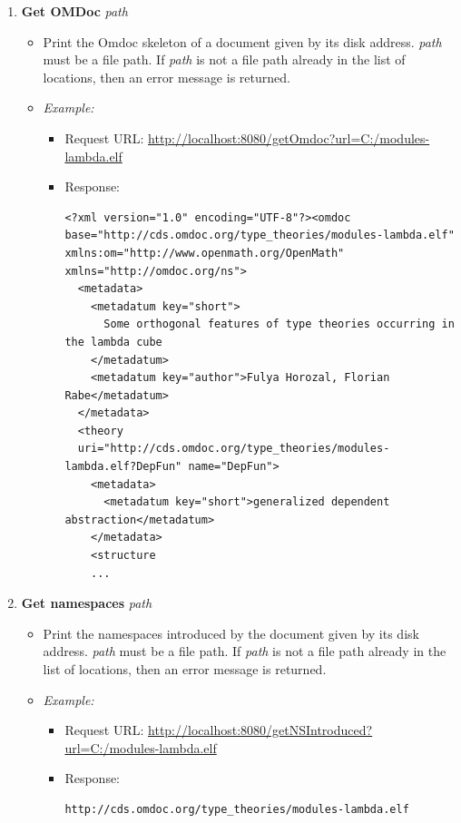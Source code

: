 \begin{enumerate}
\item \textbf{Get OMDoc} \qquad  {}\textit{path}
	\begin{itemize}
	\item Print the Omdoc skeleton of a document given by its disk address. \textit{path} must be a file path. If \textit{path} is  not a file path already in the list of locations, then an error message is returned.
	\item \textit{Example:} 
		\begin{itemize}
		\item Request URL:  \url{http://localhost:8080/getOmdoc?url=C:/modules-lambda.elf}
		\item Response: 
		\begin{verbatim}<?xml version="1.0" encoding="UTF-8"?><omdoc 
base="http://cds.omdoc.org/type_theories/modules-lambda.elf" xmlns:om="http://www.openmath.org/OpenMath" xmlns="http://omdoc.org/ns">
  <metadata>
    <metadatum key="short">
      Some orthogonal features of type theories occurring in the lambda cube
    </metadatum>
    <metadatum key="author">Fulya Horozal, Florian Rabe</metadatum>
  </metadata>
  <theory 
  uri="http://cds.omdoc.org/type_theories/modules-lambda.elf?DepFun" name="DepFun">
    <metadata>
      <metadatum key="short">generalized dependent abstraction</metadatum>
    </metadata>
    <structure
    ...\end{verbatim}
		\end{itemize}
	\end{itemize}



\item \textbf{Get namespaces} \qquad  {}\textit{path}
	\begin{itemize}
	\item Print the namespaces introduced by the document given by its disk address. \textit{path} must be a file path. If \textit{path} is  not a file path already in the list of locations, then an error message is returned.
	\item \textit{Example:} 
		\begin{itemize}
		\item Request URL:  \url{http://localhost:8080/getNSIntroduced?url=C:/modules-lambda.elf}
		\item Response: 
		\begin{verbatim}http://cds.omdoc.org/type_theories/modules-lambda.elf\end{verbatim}
		\end{itemize}
	\end{itemize}



\end{enumerate}
